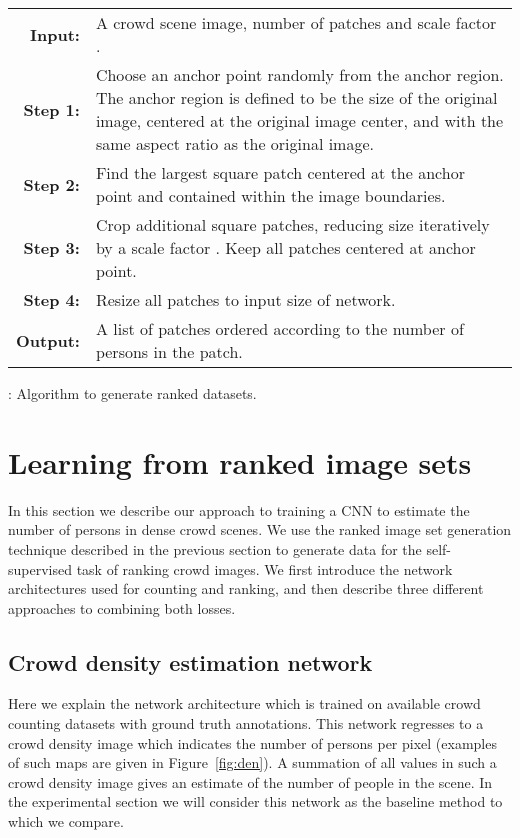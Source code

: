 \documentclass[10pt,twocolumn,letterpaper]{article}
\begin{document}
\begin{algorithm}[tb]
\centering
\begin{tabularx}{\columnwidth}{rp{}}
\hline
\textbf{Input:}  & A crowd scene image, number of patches  and scale factor . \\
\textbf{Step 1:} & Choose an anchor point randomly from the anchor
region. The anchor region is defined to be  the size of the original image, centered at the original image center, and with the same aspect ratio as the original image. \\
\textbf{Step 2:} & Find the largest square patch centered at the
anchor point and contained within the image boundaries. \\
\textbf{Step 3:} & Crop  additional square patches, reducing size
iteratively by a scale factor . Keep all patches centered at
anchor point. \\
\textbf{Step 4:} & Resize all  patches to input size of network.\\
\textbf{Output:} & A list of patches ordered according to the number of persons in the patch.\\  \hline
\end{tabularx}
\caption{: Algorithm to generate ranked datasets.}
\label{table:algorithm2}
\end{algorithm}


\section{Learning from ranked image sets} \label{sec:method}
In this section we describe our approach to training a CNN to estimate the number of persons in dense crowd scenes. We use the ranked image set generation technique described in the previous section to generate data for the self-supervised task of ranking crowd images. We first introduce the network architectures used for counting and ranking, and then describe three different approaches to combining both losses.


\subsection{Crowd density estimation network}
Here we explain the network architecture which is trained on available crowd counting datasets with ground truth annotations. This network regresses to a crowd density image which indicates the number of persons per pixel (examples of such maps are given in Figure~\ref{fig:den}). A summation of all values in such a crowd density image gives an estimate of the number of people in the scene. In the experimental section we will consider this network as the baseline method to which we compare.
\end{document}
